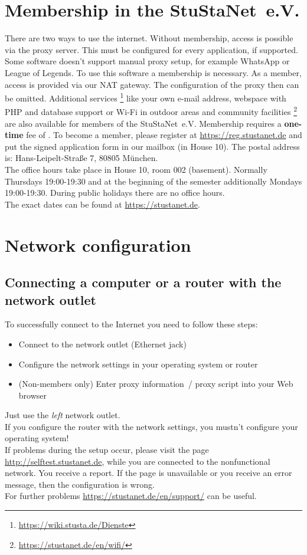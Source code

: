 \documentclass[a4paper,12pt]{scrartcl}
\begin{document}
\section*{Membership in the StuStaNet~e.V.}
There are two ways to use the internet. Without membership, access is possible via the proxy server. This must be configured for every application, if supported. Some software doesn't support manual proxy setup, for example WhatsApp or League of Legends. To use this software a membership is necessary.
\pagebreak\linebreak
As a member, access is provided via our NAT gateway. The configuration of the proxy then can be omitted. Additional services \footnote{\url{https://wiki.stusta.de/Dienste}} like your own e-mail address, webspace with PHP and database support or Wi-Fi in outdoor areas and community facilities \footnote{\url{https://stustanet.de/en/wifi/}} are also available for members of the StuStaNet~e.V. Membership requires a \textbf{one-time} fee of . To become a member, please register at \mbox{\url{https://reg.stustanet.de}} and put the signed application form in our mailbox (in House 10). The postal address is: Hans-Leipelt-Straße 7, 80805 München.
\\
The office hours take place in House 10, room 002 (basement). Normally Thursdays 19:00-19:30 and at the beginning of the semester additionally Mondays 19:00-19:30. During public holidays there are no office hours.
\\
The exact dates can be found at \mbox{\url{https://stustanet.de}}.


\section*{Network configuration}
\subsection*{Connecting a computer or a router with the network outlet}

To successfully connect to the Internet you need to follow these steps:
\begin{itemize}
    \item Connect to the network outlet (Ethernet jack)
    \item Configure the network settings in your operating system or router
    \item (Non-members only) Enter proxy information~/ proxy script into your Web browser
\end{itemize}
Just use the \emph{left} network outlet.\\
If you configure the router with the network settings, you mustn't configure your operating system!\\
If problems during the setup occur, please visit the page \mbox{\url{http://selftest.stustanet.de}}, while you are connected to the nonfunctional network. You receive a report. If the page is unavailable or you receive an error message, then the configuration is wrong.\\
For further problems \mbox{\url{https://stustanet.de/en/support/}} can be useful.
\end{document}
